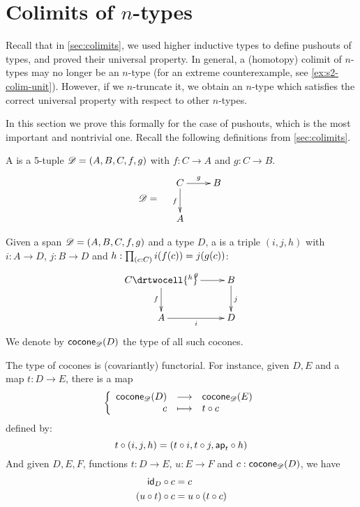 \section{Colimits of \texorpdfstring{$n$}{n}-types}
\label{sec:pushouts}

Recall that in \autoref{sec:colimits}, we used higher inductive types to define pushouts of types, and proved their universal property.
In general, a (homotopy) colimit of $n$-types may no longer be an $n$-type (for an extreme counterexample, see \autoref{ex:s2-colim-unit}).
However, if we $n$-truncate it, we obtain an $n$-type which satisfies the correct universal property with respect to other $n$-types.

In this section we prove this formally for the case of pushouts, which is the most important and nontrivial one.
Recall the following definitions from \autoref{sec:colimits}.

\begin{defn}
  A  %
  is a 5-tuple $\mathscr{D}=(A,B,C,f,g)$ with %
  $f:C\to{}A$ and $g:C\to{}B$.
  \[\Ddiag=\quad\vcenter{\xymatrix{C \ar^g[r] \ar_f[d] & B \\ A & }}\]
\end{defn}

\begin{defn}
  Given a span $\mathscr{D}=(A,B,C,f,g)$ and a type $D$, a %
   is a triple $(i, j, h)$
  with $i:A\to{}D$, $j:B\to{}D$ and $h : \prd{c:C}i(f(c))=j(g(c))$:
  \[\uppercurveobject{{ }}\lowercurveobject{{ }}\twocellhead{{ }}
  \xymatrix{C \ar^g[r] \ar_f[d] \drtwocell{^h} & B \ar^j[d] \\ A \ar_i[r] & D
  }\]
  We denote by $\mathsf{cocone}_{\mathscr{D}}(D)$ the type of all such cocones.
\end{defn}

The type of cocones is (covariantly) functorial.
For instance, given $D,E$ %
and a map $t:D\to{}E$, there is a map
  \[\left\{\begin{array}{rcl}\mathsf{cocone}_{\mathscr{D}}(D) & \longrightarrow & \mathsf{cocone}_{\mathscr{D}}(E) \\ c & \longmapsto & t\circ c \end{array}\right.\]
  defined by:
  \[t\circ(i,j,h)=(t\circ{}i,t\circ{}j,\mathsf{ap}_{t}\circ{}h)\]
And given $D,E,F$, %
functions $t:D\to{}E$, $u:E\to{}F$ and $c:\mathsf{cocone}_{\mathscr{D}}(D)$, we have
\begin{align}
  \composecocone{\idfunc[D]}c &= c \label{eq:composeconeid}\\
  \composecocone{(u\circ{}t)}c&=\composecocone{u}(\composecocone{t}c)\label{eq:composeconefunc}
\end{align}

